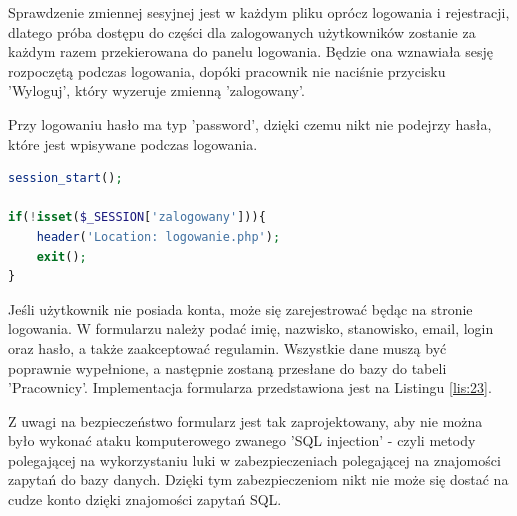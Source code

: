 \documentclass[eng,printmode,openany,oneside]{mgr}
\begin{document}
Sprawdzenie zmiennej sesyjnej jest w każdym pliku oprócz logowania i rejestracji, dlatego próba dostępu do części dla zalogowanych użytkowników zostanie za każdym razem przekierowana do panelu logowania. Będzie ona wznawiała sesję rozpoczętą podczas logowania, dopóki pracownik nie naciśnie przycisku 'Wyloguj', który wyzeruje zmienną 'zalogowany'.

Przy logowaniu hasło ma typ 'password', dzięki czemu nikt nie podejrzy hasła, które jest wpisywane podczas logowania.
	
	
	
\begin{lstlisting}[caption={Zmienna sesyjna - sprawdzenie}, language=PHP, label={lis:22}]
session_start();

if(!isset($_SESSION['zalogowany'])){
	header('Location: logowanie.php');
	exit();
}
\end{lstlisting}

	
	
	
	
	


Jeśli użytkownik nie posiada konta, może się zarejestrować będąc na stronie logowania. W formularzu należy podać imię, nazwisko, stanowisko, email, login oraz hasło, a także zaakceptować regulamin. Wszystkie dane muszą być poprawnie wypełnione, a następnie zostaną przesłane do bazy do tabeli 'Pracownicy'. Implementacja formularza przedstawiona jest na Listingu \ref{lis:23}.

Z uwagi na bezpieczeństwo formularz jest tak zaprojektowany, aby nie można było wykonać ataku komputerowego zwanego 'SQL injection' - czyli metody polegającej na wykorzystaniu luki w zabezpieczeniach polegającej na znajomości zapytań do bazy danych. Dzięki tym zabezpieczeniom nikt nie może się dostać na cudze konto dzięki znajomości zapytań SQL. 









\end{document}
